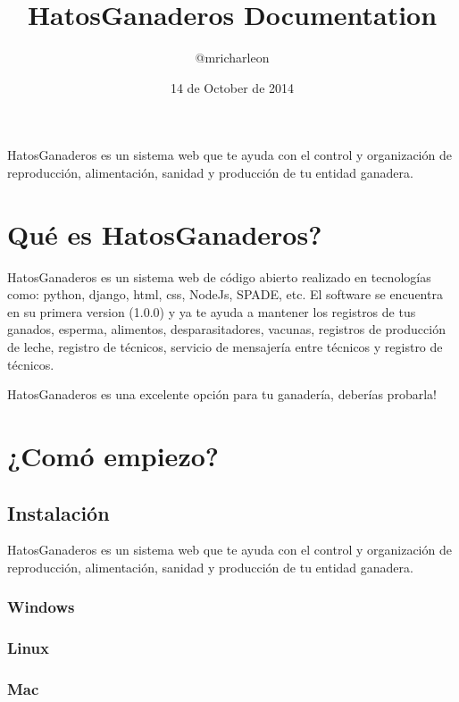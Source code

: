 \documentclass[letterpaper,10pt,spanish]{sphinxmanual}
\title{HatosGanaderos Documentation}
\date{14 de October de 2014}
\author{@mricharleon}
\begin{document}
\maketitle
\tableofcontents
{}\label{index::doc}


HatosGanaderos es un sistema web que te ayuda con el control y organización de reproducción, alimentación, sanidad y producción de tu entidad ganadera.


\chapter{Qué es HatosGanaderos?}
\label{index:welcome-to-hatosganaderos-s-documentation}\label{index:que-es-hatosganaderos}
HatosGanaderos es un sistema web de código abierto realizado en tecnologías como: python, django, html, css, NodeJs, SPADE, etc. El software se encuentra en su primera version (1.0.0) y ya te ayuda a mantener los registros de tus ganados, esperma, alimentos, desparasitadores, vacunas, registros de producción de leche, registro de técnicos, servicio de mensajería entre técnicos y registro de técnicos.

HatosGanaderos es una excelente opción para tu ganadería, deberías probarla!


\chapter{¿Comó empiezo?}
\label{index:como-empiezo}

\section{Instalación}
\label{Instalaci_xf3n:instalacion}\label{Instalaci_xf3n::doc}
HatosGanaderos es un sistema web que te ayuda con el control y organización de reproducción, alimentación, sanidad y producción de tu entidad ganadera.


\subsection{Windows}
\label{Instalaci_xf3n:windows}

\subsection{Linux}
\label{Instalaci_xf3n:linux}

\subsection{Mac}
\label{Instalaci_xf3n:mac}
\end{document}
